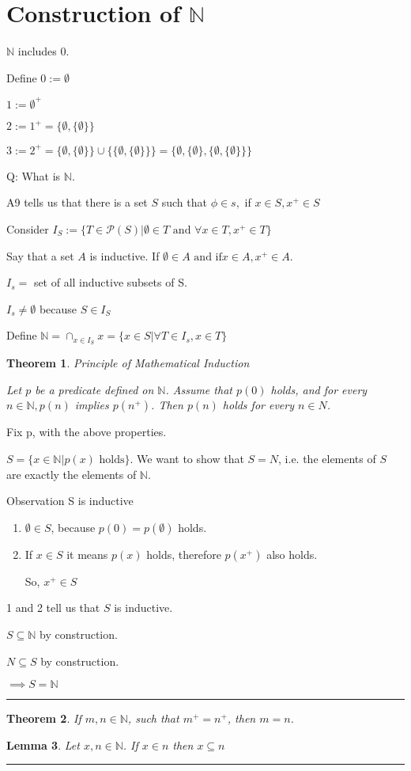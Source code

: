 \documentclass[twoside]{article}
\newcounter{lecnum}
\newcommand{\N}{\mathbb{N}}
\newcommand{\PS}{\mathcal P}
\newtheorem{theorem}{Theorem}[lecnum]
\newtheorem{lemma}[theorem]{Lemma}
\newenvironment{proof}{{\bf Proof:}}{\hfill\rule{2mm}{2mm}}
\begin{document}
\section{Construction  of $\N$}

$\N$ includes 0.

Define $0 := \emptyset$

$1 := \emptyset^+$


$2 := 1^+ = \{\emptyset, \{\emptyset\}\}$

$3 := 2^+ = \{\emptyset, \{\emptyset\}\} \cup \{\{\emptyset, \{ \emptyset\}\}\} = \{\emptyset, \{\emptyset\},\{\emptyset, \{ \emptyset\}\}\}$

Q: What is $\N$.

A9 tells us that there is a set $S$ such that $\phi \in s,$ if $x \in S, x^+ \in S$

Consider $I_S := \{T \in \PS (S) \vert \emptyset \in T \text{ and } \forall x \in T, x^+ \in T\}$

Say that a set $A$ is inductive. If $\emptyset \in A \text{ and if} x \in A, x^+ \in A$.

$I_s =$ set of all inductive subsets of S.

$I_s \neq \emptyset$ because $S \in I_S$

Define $\N = \cap_{x \in I_S} x = \{ x \in S \vert \forall T \in I_s, x \in T\}$

\begin{theorem}{Principle of Mathematical Induction}

    Let $p$ be a predicate defined on $\N$. Assume that $p(0)$ holds, and for every $n \in \N, p(n)$ implies $p (n^+)$.
    Then $p(n)$ holds for every $n \in N$.
    
\end{theorem}

\begin{proof}
    Fix p, with the above properties. 

    $S = \{x \in \N \vert p(x) \text{ holds}\}$.
    We want to show that $S = N$, i.e. the elements of $S$ are exactly the elements of $\N$. 

    Observation
    S is inductive
    \begin{enumerate}
        \item $\emptyset \in S$, because $p(0) = p(\emptyset)$ holds. 
        \item If $x \in S$ it means $p(x)$ holds, therefore $p(x^+)$ also holds. 

        So, $x^+ \in S$  
    \end{enumerate}

    1 and 2 tell us that $S$ is inductive. 

    $S \subseteq \N$ by construction. 

    $N \subseteq S$ by construction. 

    $\implies S = \N$
\end{proof}

\begin{theorem}
    If $m, n \in \N$, such that $m^+ = n^+$, then $m = n$. 
\end{theorem}

\begin{proof}
    \begin{lemma}
        Let $x, n \in \N$.
        If $x \in n$ then $x \subseteq n$ 
    \end{lemma}
\end{proof}
\end{document}
